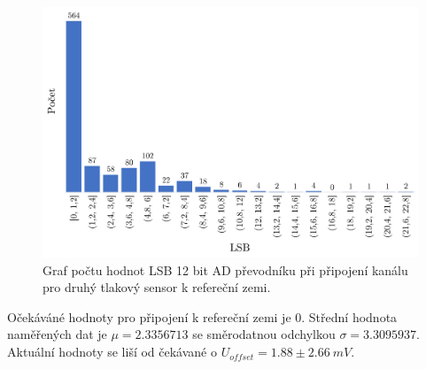\begin{figure}[H]
    \caption{Graf počtu hodnot LSB 12 bit AD převodníku při připojení kanálu pro druhý tlakový sensor k refereční zemi.}
    \label{fig:hist_vacuum2_gnd}
    \includegraphics[width=1\textwidth]{graphs/vacuum2_gnd.png}

\end{figure}
Očekáváné hodnoty pro připojení k refereční zemi je 0. Střední hodnota naměřených dat je $\mu = 2.3356713$ se směrodatnou odchylkou $\sigma = 3.3095937$. Aktuální hodnoty se liší od čekávané o $U_{offset} = 1.88 \pm 2.66 \ mV$.

